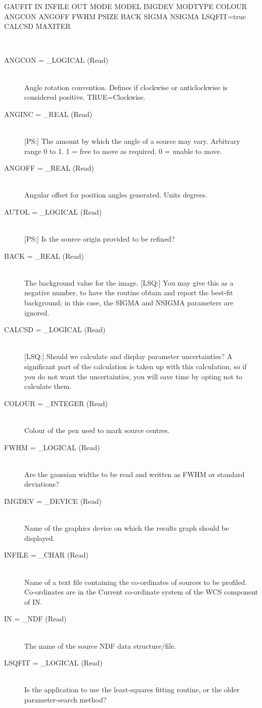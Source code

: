 \documentclass[twoside,11pt]{article}
\newcommand{\LineBreak}{\hfill\break\hbox{}\qquad}
\newcommand{\sstparameters}[1]{
   \item[Parameters:] \mbox{} \\
   \vspace{-3.5ex}
   \begin{description}
      #1
   \end{description}
}
\newcommand{\sstsubsection}[1]{ \item[{#1}] \mbox{} \\}
\newcommand{\sstparameters}[1]{
      \item[Parameters:] \\
      \begin{description}
         #1
      \end{description}
      \\
   }
\newcommand{\sstsubsection}[1]{\item[{#1}]}
\begin{document}
{{      GAUFIT IN INFILE OUT MODE MODEL IMGDEV
\LineBreak
             MODTYPE COLOUR ANGCON ANGOFF FWHM PSIZE
\LineBreak
             BACK SIGMA NSIGMA
\LineBreak
             LSQFIT=true CALCSD MAXITER
   }
   \sstparameters{
      \sstsubsection{
         ANGCON = \_LOGICAL (Read)
      }{
         Angle rotation convention. Defines if clockwise or
         anticlockwise is considered positive. TRUE=Clockwise.
      }
      \sstsubsection{
         ANGINC = \_REAL (Read)
      }{
         [PS:] The amount by which the angle of a source may vary.
         Arbitrary range 0 to 1. 1 = free to move as required.
         0 = unable to move.
      }
      \sstsubsection{
         ANGOFF = \_REAL (Read)
      }{
         Angular offset for position angles generated. Units degrees.
      }
      \sstsubsection{
         AUTOL = \_LOGICAL (Read)
      }{
         [PS:] Is the source origin provided to be refined?
      }
      \sstsubsection{
         BACK = \_REAL (Read)
      }{
         The background value for the image.  [LSQ:] You may give this
         as a negative number, to have the routine obtain and report the
         best-fit background; in this case, the SIGMA and NSIGMA
         parameters are ignored.
      }
      \sstsubsection{
         CALCSD = \_LOGICAL (Read)
      }{
         [LSQ:] Should we calculate and display parameter uncertainties?
         A significant part of the calculation is taken up with this
         calculation, so if you do not want the uncertainties, you will save
         time by opting not to calculate them.
      }
      \sstsubsection{
         COLOUR = \_INTEGER (Read)
      }{
         Colour of the pen used to mark source centres.
      }
      \sstsubsection{
         FWHM = \_LOGICAL (Read)
      }{
         Are the gaussian widths to be read and written as FWHM or
         standard deviations?
      }
      \sstsubsection{
         IMGDEV = \_DEVICE (Read)
      }{
         Name of the graphics device on which the results graph should
         be displayed.
      }
      \sstsubsection{
         INFILE = \_CHAR (Read)
      }{
         Name of a text file containing the co-ordinates of sources
         to be profiled.  Co-ordinates are in the Current co-ordinate
         system of the WCS component of IN.
      }
      \sstsubsection{
         IN = \_NDF (Read)
      }{
         The name of the source NDF data structure/file.
      }
      \sstsubsection{
         LSQFIT = \_LOGICAL (Read)
      }{
         Is the application to use the least-squares fitting
         routine, or the older parameter-search method?
}}}
\end{document}

